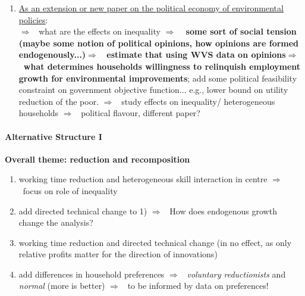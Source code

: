 \documentclass[12pt]{article}
\newcommand{\ar}{$\Rightarrow$ \ }
\begin{document}
\begin{enumerate}
\item \underline{As an extension or new paper on the political economy of environmental policies}: \\
\ar what are the effects on inequality \ar \textbf{ some sort of social tension (maybe some notion of political opinions, how opinions are formed endogenously...)\ar estimate that using WVS data on opinions\ar what determines households willingness to relinquish employment growth for environmental improvements}; 
 add some political feasibility constraint on government objective function... e.g., lower bound on utility reduction of the poor. \ar study effects on inequality/ heterogeneous households \ar political flavour, different paper?

\end{enumerate}

\paragraph{Alternative Structure I}
\textbf{Overall theme: reduction and recomposition}

\begin{enumerate}
\item working time reduction and heterogeneous skill interaction in centre \ar focus on role of inequality
\item add directed technical change to 1) \ar How does endogenous growth change the analysis? 
\item working time reduction and directed technical change (in \cite{Acemoglu2012TheChange} no effect, as only relative profits matter for the direction of innovations)
\item add differences in household preferences \ar \textit{voluntary reductionists} and \textit{normal} (more is better) \ar to be informed by data on preferences!
\end{enumerate}
\end{document}
